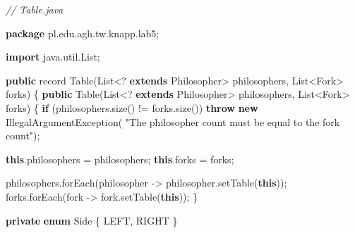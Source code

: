 \documentclass[11pt]{article}
\newenvironment{Shaded}{}{}
\newcommand{\KeywordTok}[1]{\textcolor[rgb]{0.00,0.44,0.13}{\textbf{{#1}}}}
\newcommand{\StringTok}[1]{\textcolor[rgb]{0.25,0.44,0.63}{{#1}}}
\newcommand{\CommentTok}[1]{\textcolor[rgb]{0.38,0.63,0.69}{\textit{{#1}}}}
\newcommand{\FunctionTok}[1]{\textcolor[rgb]{0.02,0.16,0.49}{{#1}}}
\newcommand{\NormalTok}[1]{{#1}}
\newcommand{\ImportTok}[1]{{#1}}
\newcommand{\ControlFlowTok}[1]{\textcolor[rgb]{0.00,0.44,0.13}{\textbf{{#1}}}}
\newcommand{\OperatorTok}[1]{\textcolor[rgb]{0.40,0.40,0.40}{{#1}}}
\newcommand{\BuiltInTok}[1]{{#1}}
\begin{document}
\begin{Shaded}
\begin{Highlighting}[]
\CommentTok{// Table.java}

\KeywordTok{package}\ImportTok{ pl}\OperatorTok{.}\ImportTok{edu}\OperatorTok{.}\ImportTok{agh}\OperatorTok{.}\ImportTok{tw}\OperatorTok{.}\ImportTok{knapp}\OperatorTok{.}\ImportTok{lab5}\OperatorTok{;}

\KeywordTok{import} \ImportTok{java}\OperatorTok{.}\ImportTok{util}\OperatorTok{.}\ImportTok{List}\OperatorTok{;}

\KeywordTok{public}\NormalTok{ record }\FunctionTok{Table}\OperatorTok{(}\BuiltInTok{List}\OperatorTok{\textless{}?} \KeywordTok{extends}\NormalTok{ Philosopher}\OperatorTok{\textgreater{}}\NormalTok{ philosophers}\OperatorTok{,} \BuiltInTok{List}\OperatorTok{\textless{}}\NormalTok{Fork}\OperatorTok{\textgreater{}}\NormalTok{ forks}\OperatorTok{)} \OperatorTok{\{}
    \KeywordTok{public} \FunctionTok{Table}\OperatorTok{(}\BuiltInTok{List}\OperatorTok{\textless{}?} \KeywordTok{extends}\NormalTok{ Philosopher}\OperatorTok{\textgreater{}}\NormalTok{ philosophers}\OperatorTok{,} \BuiltInTok{List}\OperatorTok{\textless{}}\NormalTok{Fork}\OperatorTok{\textgreater{}}\NormalTok{ forks}\OperatorTok{)} \OperatorTok{\{}
        \ControlFlowTok{if} \OperatorTok{(}\NormalTok{philosophers}\OperatorTok{.}\FunctionTok{size}\OperatorTok{()} \OperatorTok{!=}\NormalTok{ forks}\OperatorTok{.}\FunctionTok{size}\OperatorTok{())}
            \ControlFlowTok{throw} \KeywordTok{new} \BuiltInTok{IllegalArgumentException}\OperatorTok{(}
                \StringTok{"The philosopher count must be equal to the fork count"}\OperatorTok{);}

        \KeywordTok{this}\OperatorTok{.}\FunctionTok{philosophers} \OperatorTok{=}\NormalTok{ philosophers}\OperatorTok{;}
        \KeywordTok{this}\OperatorTok{.}\FunctionTok{forks} \OperatorTok{=}\NormalTok{ forks}\OperatorTok{;}

\NormalTok{        philosophers}\OperatorTok{.}\FunctionTok{forEach}\OperatorTok{(}\NormalTok{philosopher }\OperatorTok{{-}\textgreater{}}\NormalTok{ philosopher}\OperatorTok{.}\FunctionTok{setTable}\OperatorTok{(}\KeywordTok{this}\OperatorTok{));}
\NormalTok{        forks}\OperatorTok{.}\FunctionTok{forEach}\OperatorTok{(}\NormalTok{fork }\OperatorTok{{-}\textgreater{}}\NormalTok{ fork}\OperatorTok{.}\FunctionTok{setTable}\OperatorTok{(}\KeywordTok{this}\OperatorTok{));}
    \OperatorTok{\}}

    \KeywordTok{private} \KeywordTok{enum}\NormalTok{ Side }\OperatorTok{\{}
\NormalTok{        LEFT}\OperatorTok{,}\NormalTok{ RIGHT}
    \OperatorTok{\}}


\end{Highlighting}
\end{Shaded}
\end{document}
